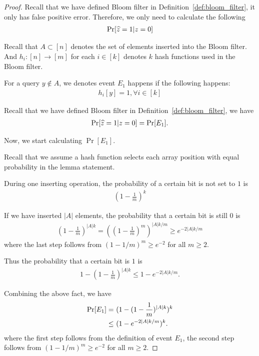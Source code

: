 \begin{proof}
Recall that we have defined Bloom filter in Definition~\ref{def:bloom_filter}, it only has false positive error. Therefore, we only need to calculate the following
\begin{align*}
    \Pr[\widehat{z} = 1 | z = 0]
\end{align*}

Recall that $A \subset [n]$ denotes the set of elements inserted into the Bloom filter. And $h_i : [n] \rightarrow [m]$ for each $i \in [k]$ denotes $k$ hash functions used in the Bloom filter. 

For a query $y \notin A$, we denotes event $E_1$ happens if the following happens:
\begin{align*}
    h_i[y] = 1, \forall i \in [k]
\end{align*}

Recall that we have defined Bloom filter in Definition~\ref{def:bloom_filter}, we have 
\begin{align}\label{eq:def_E_1}
    \Pr[\widehat{z} = 1 | z = 0] = \Pr[E_1].
\end{align}

Now, we start calculating $\Pr[E_1]$.

Recall that we assume a hash function selects each array position with equal probability in the lemma statement. 

During one inserting operation, the probability of a certain bit is not set to $1$ is 
\begin{align*}
    (1 - \frac{1}{m})^k
\end{align*}



If we have inserted $|A|$ elements, the probability that a certain bit is still $0$ is
\begin{align*}
    (1 - \frac{1}{m})^{|A| k} = ( (1-\frac{1}{m})^{m} )^ {|A| k/m } \geq e^{-2 |A| k / m}
\end{align*}
where the last step follows from $(1-1/m)^m \geq e^{-2}$ for all $m \geq 2$.

Thus the probability that a certain bit is $1$ is
\begin{align*}
    1 - (1 - \frac{1}{m})^{ |A| k} \leq 1 - e^{-2 |A| k / m}.
\end{align*}

Combining the above fact, we have
\begin{align}\label{eq:pr_e}
    \Pr[E_1] = & ~ (1 - (1 - \frac{1}{m})^{|A|k})^k \notag \\
    \leq & ~ (1 - e^{-2 |A| k / m})^k.
\end{align}
where the first step follows from the definition of event $E_1$, the second step follows from $(1-1/m)^m \geq e^{-2}$ for all $m \geq 2$. 


\end{proof}
